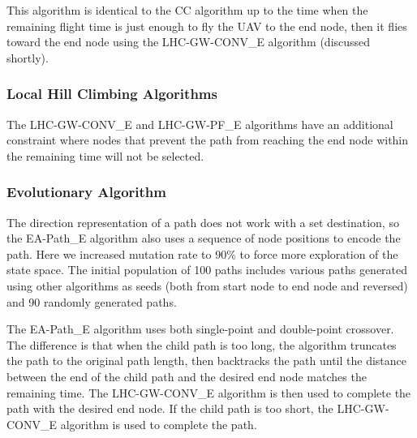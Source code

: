 This algorithm is identical to the CC algorithm up to the time when the remaining flight time is just enough to fly the UAV to the end node, then it flies toward the end node using the LHC-GW-CONV\_E algorithm (discussed shortly).

%

\subsubsection{Local Hill Climbing Algorithms}

The LHC-GW-CONV\_E and LHC-GW-PF\_E algorithms have an additional constraint where nodes that prevent the path from reaching the end node within the remaining time will not be selected.

\subsubsection{Evolutionary Algorithm}

The direction representation of a path does not work with a set destination, so the EA-Path\_E algorithm also uses a sequence of node positions to encode the path. Here we increased mutation rate to 90\% to force more exploration of the state space. The initial population of 100 paths includes various paths generated using other algorithms as seeds (both from start node to end node and reversed) and 90 randomly generated paths.

The EA-Path\_E algorithm uses both single-point and double-point crossover. The difference is that when the child path is too long, the algorithm truncates the path to the original path length, then backtracks the path until the distance between the end of the child path and the desired end node matches the remaining time. The LHC-GW-CONV\_E algorithm is then used to complete the path with the desired end node. If the child path is too short, the LHC-GW-CONV\_E algorithm is used to complete the path.

